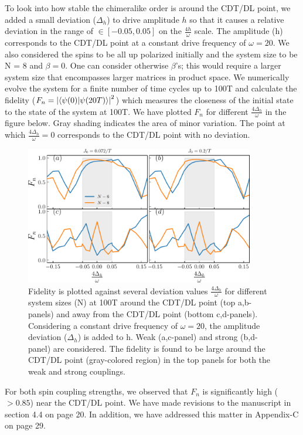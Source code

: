 \documentclass[aps,prb,reprint,showpacs,floatfix,superscriptaddress, onecolumn, nofootinbib, 10pt]{revtex4-2}
\begin{document}
\begin{enumerate}
\begin{enumerate}
\begin{enumerate}
{			To look into how stable the chimeralike order is around the CDT/DL point, we added a small deviation ($\Delta_h$) to drive amplitude $h$ so that it causes a relative deviation in the range of $\in[-0.05, 0.05]$ on the $\frac{4h}{\omega}$ scale. The amplitude (h) corresponds to the CDT/DL point at a constant drive frequency of $\omega = 20$. We also considered the spins to be all up polarized initially and the system size to be N = 8 and $\beta=0$. One can consider otherwise $\beta$'s; this would require a larger system size that encompasses larger matrices in product space. We numerically evolve the system for a finite number of time cycles up to 100T and calculate the fidelity ($F_n = \abs{\braket{\psi(0)}{\psi (20T)}}^2$) which measures the closeness of the initial state to the state of the system at 100T. We have plotted $F_n$ for different $\frac{4\Delta_h}{\omega}$ in the figure below. Gray shading indicates the area of minor variation. The point at which $\frac{4\Delta_h}{\omega} = 0$ corresponds to the CDT/DL point with no deviation. 
			\begin{figure}[h!]
				\begin{center}
					\includegraphics[width=10cm]{./figs/figure14.pdf}
				\end{center}
				\caption{Fidelity is plotted against several deviation values $\frac{4\Delta_h}{\omega}$ for different system sizes (N) at 100T around the CDT/DL point (top a,b-panels) and away from the CDT/DL point (bottom c,d-panels). Considering a constant drive frequency of $\omega= 20$, the amplitude deviation ($\Delta_h$) is added to h. Weak (a,c-panel) and strong (b,d-panel) are considered. The fidelity is found to be large around the CDT/DL point (gray-colored region) in the top panels for both the weak and strong couplings.}
				\label{Fig:aroundCDT}
			\end{figure}
		
			For both spin coupling strengths, we observed that $F_n$ is significantly high ($>0.85$) near the CDT/DL point. We have made revisions to the manuscript in section 4.4 on page 20. In addition, we have addressed this matter in Appendix-C on page 29. 
			}
		\end{enumerate}
		

\end{enumerate}
\end{enumerate}
\end{document}
